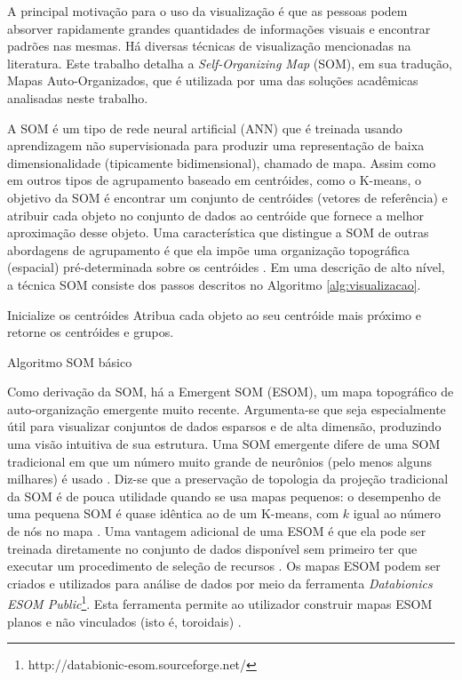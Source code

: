 A principal motivação para o uso da visualização é que as pessoas podem absorver rapidamente grandes quantidades de informações visuais e encontrar padrões nas mesmas. Há diversas técnicas de visualização mencionadas na literatura. Este trabalho detalha a \textit{Self-Organizing Map} (SOM), em sua tradução, Mapas Auto-Organizados, que é utilizada por uma das soluções acadêmicas analisadas neste trabalho.

A SOM é um tipo de rede neural artificial (ANN) que é treinada usando aprendizagem não supervisionada para produzir uma representação de baixa dimensionalidade (tipicamente bidimensional), chamado de mapa. Assim como em outros tipos de agrupamento baseado em centróides, como o K-means, o objetivo da SOM é encontrar um conjunto de centróides (vetores de referência) e atribuir cada objeto no conjunto de dados ao centróide que fornece a melhor aproximação desse objeto. Uma característica que distingue a SOM de outras abordagens de agrupamento é que ela impõe uma organização topográfica (espacial) pré-determinada sobre os centróides \cite{pang2009}. Em uma descrição de alto nível, a técnica SOM consiste dos passos descritos no Algoritmo \ref{alg:visualizacao}.

\begin{algorithm}[!htb]
    \SetAlgoLined
    Inicialize os centróides\;
    Atribua cada objeto ao seu centróide mais próximo e retorne os centróides e grupos.
\caption{Algoritmo SOM básico}
\label{alg:visualizacao}
\end{algorithm}

Como derivação da SOM, há a Emergent SOM (ESOM), um mapa topográfico de auto-organização emergente muito recente. Argumenta-se que seja especialmente útil para visualizar conjuntos de dados esparsos e de alta dimensão, produzindo uma visão intuitiva de sua estrutura. Uma SOM emergente difere de uma SOM tradicional em que um número muito grande de neurônios (pelo menos alguns milhares) é usado \cite{ultsch2005-2}. Diz-se que a preservação de topologia da projeção tradicional da SOM é de pouca utilidade quando se usa mapas pequenos: o desempenho de uma pequena SOM é quase idêntica ao de um K-means, com \textbf{\({k}\)} igual ao número de nós no mapa \cite{ultsch2005}. Uma vantagem adicional de uma ESOM é que ela pode ser treinada diretamente no conjunto de dados disponível sem primeiro ter que executar um procedimento de seleção de recursos \cite{ultsch2003}. Os mapas ESOM podem ser criados e utilizados para análise de dados por meio da ferramenta \textit{Databionics ESOM Public}\footnote{http://databionic-esom.sourceforge.net/ }. Esta ferramenta permite ao utilizador construir mapas ESOM planos e não vinculados (isto é, toroidais) \cite{ultsch2007}.

